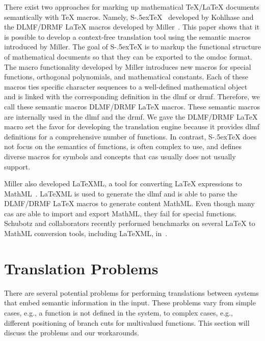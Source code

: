 \documentclass[a4paper,11pt]{article}
\newcommand{\DLMF}{DLMF}
\newcommand{\DRMF}{DRMF}
\newcommand{\Macro}{\DLMF/\DRMF{} \LaTeX{} macro}
\newcommand{\sTeX}{{\raisebox{-.5ex}S\kern-.5ex\TeX}}
\theoremstyle{defTheoStyle}
\theoremstyle{defExampStyle}
\begin{document}
There exist two approaches for marking up mathematical \TeX/\LaTeX{} documents semantically with \TeX{} macros. Namely, \sTeX{}~\parencite{sTeX} developed by Kohlhase and the \Macro s developed by Miller~\parencite{DLMF:Macros}. This paper shows that it is possible to develop a context-free translation tool using  the semantic macros introduced by Miller. The goal of \sTeX{} is to markup the functional structure of mathematical documents so that they can be exported to the \gls*{omdoc} format. The macro functionality developed by Miller introduces new macros for special functions, orthogonal polynomials, and mathematical constants. Each of these macros ties specific character sequences to a well-defined mathematical object and is linked with the corresponding definition in the \gls*{dlmf} or \gls*{drmf}. Therefore, we call these semantic macros \Macro s. These semantic macros are internally used in the \gls*{dlmf} and the \gls*{drmf}. We gave the \Macro{} set the favor for developing the translation engine because it provides \gls*{dlmf} definitions for a comprehensive number of functions. In contrast, \sTeX{} does not focus on the semantics of functions, is often complex to use, and defines diverse macros for symbols and concepts that \gls*{cas} usually does not usually support.

Miller also developed LaTeXML, a tool for converting \LaTeX{} expressions to MathML~\parencite{LaTeXML}. LaTeXML is used to generate the \gls*{dlmf} and is able to parse the \Macro s to generate content MathML. Even though many \gls*{cas} are able to import and export MathML, they fail for special functions. Schubotz and collaborators recently performed benchmarks on several \LaTeX{} to MathML conversion tools, including LaTeXML, in~\parencite{DBLP:conf/jcdl/SchubotzGSMCG18}.

\section{Translation Problems}\label{sec:problems}
There are several potential problems for performing translations between systems that embed semantic information in the input. These problems vary from simple cases, e.g., a function is not defined in the system, to complex cases, e.g., different positioning of branch cuts for multivalued functions. This section will discuss the problems and our workarounds.
\end{document}

